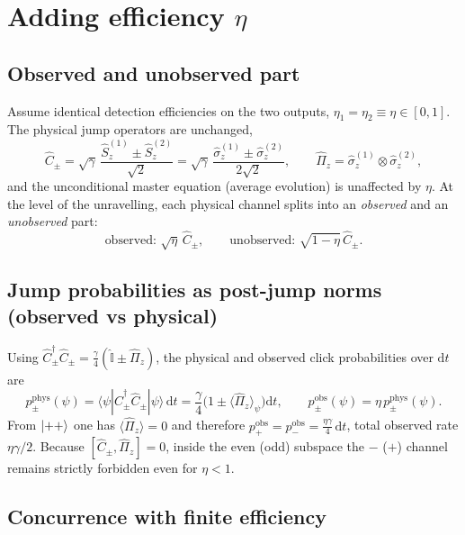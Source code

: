 \documentclass[12pt,a4paper]{article}
\begin{document}
	\section{Adding efficiency \texorpdfstring{$\eta$}{eta}}
	
	\subsection{Observed and unobserved part}
	Assume identical detection efficiencies on the two outputs, \(\eta_1=\eta_2\equiv\eta\in[0,1]\).
	The physical jump operators are unchanged,
	\[
	\hat C_{\pm}=\sqrt{\gamma}\,\frac{\hat S^{(1)}_z\pm \hat S^{(2)}_z}{\sqrt{2}}
	=\sqrt{\gamma}\,\frac{\hat\sigma^{(1)}_z\pm \hat\sigma^{(2)}_z}{2\sqrt{2}},
	\qquad
	\hat\Pi_z=\hat\sigma^{(1)}_z\otimes\hat\sigma^{(2)}_z,
	\]
	and the unconditional master equation (average evolution) is unaffected by \(\eta\).
	At the level of the unravelling, each physical channel splits into an \emph{observed}
	and an \emph{unobserved} part:
	\[
	\text{observed: }\sqrt{\eta}\,\hat C_{\pm},\qquad
	\text{unobserved: }\sqrt{1-\eta}\,\hat C_{\pm}.
	\]
	
	\subsection{Jump probabilities as post-jump norms (observed vs physical)}
	
	Using \(\hat C_{\pm}^\dagger\hat C_{\pm}=\tfrac{\gamma}{4}(\hat{\mathbb{I}}\pm \hat\Pi_z)\),
	the physical and observed click probabilities over \(\mathrm dt\) are
	\[
	p_{\pm}^{\mathrm{phys}}(\psi)=\langle \psi|\hat C_{\pm}^\dagger\hat C_{\pm}|\psi\rangle\,\mathrm dt
	=\frac{\gamma}{4}\big(1\pm \langle \hat\Pi_z\rangle_{\psi}\big)\mathrm dt,
	\qquad
	p_{\pm}^{\mathrm{obs}}(\psi)=\eta\,p_{\pm}^{\mathrm{phys}}(\psi).
	\]
	From \(\ket{++}\) one has \(\langle \hat\Pi_z\rangle=0\) and therefore
	\(p_{+}^{\mathrm{obs}}=p_{-}^{\mathrm{obs}}=\tfrac{\eta\gamma}{4}\,\mathrm dt\), total observed rate \(\eta\gamma/2\).
	Because \([\hat C_{\pm},\hat\Pi_z]=0\), inside the even (odd) subspace the \(-\) (\(+\)) channel remains strictly forbidden even for \(\eta<1\).
	
	
	
	\subsection{Concurrence with finite efficiency}
	
\end{document}
